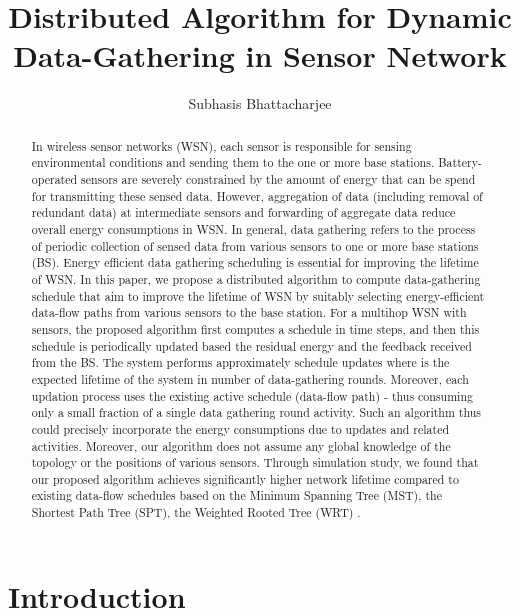 \documentclass[10pt]{llncs}
\title{Distributed Algorithm for Dynamic Data-Gathering in Sensor Network}
\author{Subhasis Bhattacharjee}
\institute{University of Bristol\\
Merchant Venturers Building\\
Bristol, BS8 1UB\\
\email{subhasis18@gmail.com}}
\begin{document}
\maketitle

\begin{abstract}

In wireless sensor networks (WSN), each sensor is responsible for sensing environmental conditions and sending them to the one or more base stations. Battery-operated sensors are severely constrained by the amount of energy that can be spend for transmitting these sensed data. However, aggregation of data (including removal of redundant data) at intermediate sensors and forwarding of aggregate data reduce overall energy consumptions in WSN. In general, data gathering refers to the process of periodic collection of sensed data from various sensors to one or more base stations (BS). Energy efficient data gathering scheduling is essential for improving the lifetime of WSN. In this paper, we propose a distributed algorithm to compute data-gathering schedule that aim to improve the lifetime of WSN by suitably selecting energy-efficient data-flow paths from various sensors to the base station. For a multihop WSN with  sensors, the proposed algorithm first computes a schedule in  time steps, and then this schedule is periodically updated based the residual energy and the feedback received from the BS. The system performs approximately  schedule updates where  is the expected lifetime of the system in number of data-gathering rounds. Moreover, each updation process uses the existing active schedule (data-flow path) - thus consuming only a small fraction of a single data gathering round activity. Such an algorithm thus could precisely incorporate the energy consumptions due to updates and related activities. Moreover, our algorithm does not assume any global knowledge of the topology or the positions of various sensors. Through simulation study, we found that our proposed algorithm achieves significantly higher network lifetime compared to existing data-flow schedules based on the Minimum Spanning Tree (MST), the Shortest Path Tree (SPT), the Weighted Rooted Tree (WRT) \cite{Bhattacharjee07}.
\end{abstract}

\section{Introduction}
\end{document}
